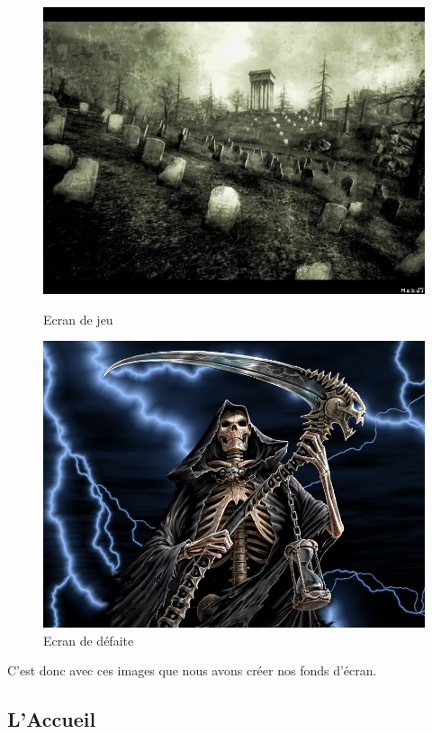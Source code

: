 \begin{figure}[H]
   \begin{minipage}[c]{.46\linewidth}
      \includegraphics[scale=0.3]{img/background.jpg}
			\caption {Ecran de jeu} 
   \end{minipage} \hfil
   \begin{minipage}[c]{.46\linewidth}
      \includegraphics[scale=0.3]{img/backgroundover.jpg}
			\caption {Ecran de défaite} 
   \end{minipage}
\end{figure}

C'est donc avec ces images que nous avons créer nos fonds d'écran.


\subsection{L'Accueil}

